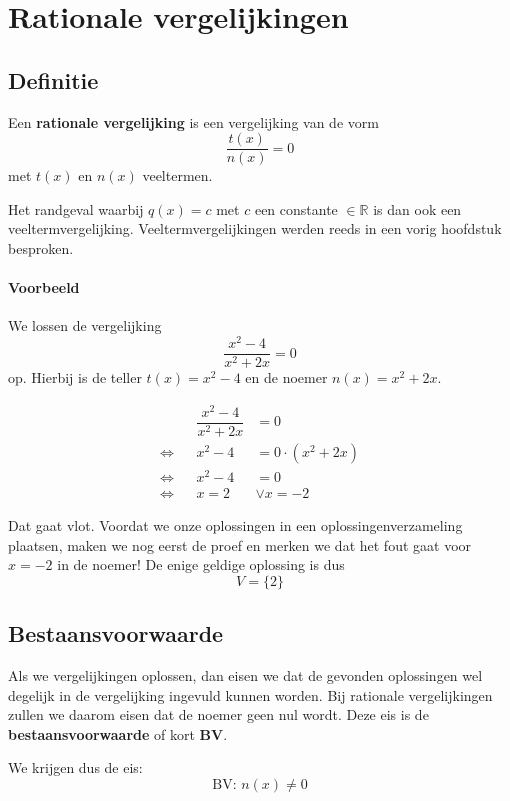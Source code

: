 \documentclass[12pt,twoside,a4paper]{article}
\begin{document}
\section{Rationale vergelijkingen}

\subsection{Definitie}

\begin{mdframed}
Een {\bf rationale vergelijking} is een vergelijking van de vorm
$$\dfrac{t(x)}{n(x)}=0$$
met $t(x)$ en $n(x)$ veeltermen.
\end{mdframed}

Het randgeval waarbij $q(x)=c$ met $c$ een constante $\in \mathbb{R}$ is dan ook een veeltermvergelijking. Veeltermvergelijkingen werden reeds in een vorig hoofdstuk besproken.

\paragraph{Voorbeeld}

We lossen de vergelijking
$$\dfrac{x^2-4}{x^2+2x}=0$$
op. Hierbij is de teller $t(x)=x^2-4$ en de noemer $n(x)=x^2+2x$.

\begin{align*}
  && \dfrac{x^2-4}{x^2+2x} &= 0\\
  \Leftrightarrow &&              x^2-4 &= 0 \cdot (x^2+2x) \\
  \Leftrightarrow &&              x^2-4 &= 0\\
  \Leftrightarrow &&              x = 2 &\vee x = -2
\end{align*}

Dat gaat vlot. Voordat we onze oplossingen in een oplossingenverzameling plaatsen, maken we nog eerst de proef en merken we dat het fout gaat voor $x=-2$ in de noemer! De enige geldige oplossing is dus
$$V=\{2\}$$

\subsection{Bestaansvoorwaarde}
Als we vergelijkingen oplossen, dan eisen we dat de gevonden oplossingen wel degelijk in de vergelijking ingevuld kunnen worden. Bij rationale vergelijkingen zullen we daarom eisen dat de noemer geen nul wordt. Deze eis is de {\bf bestaansvoorwaarde} of kort {\bf BV}.

We krijgen dus de eis:
$$ \text{BV: } n(x) \neq 0 $$
\end{document}
